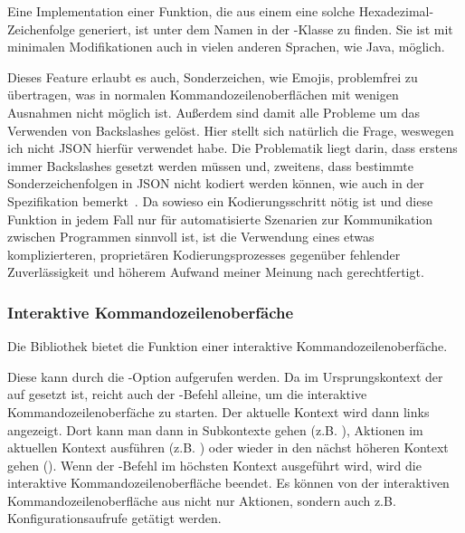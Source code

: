 Eine Implementation einer Funktion, die aus einem  eine solche Hexadezimal-Zeichenfolge generiert, ist unter dem Namen  in der -Klasse zu finden.
Sie ist mit minimalen Modifikationen auch in vielen anderen Sprachen, wie Java, möglich.

Dieses Feature erlaubt es auch, Sonderzeichen, wie Emojis, problemfrei zu übertragen, was in normalen Kommandozeilenoberflächen mit wenigen Ausnahmen nicht möglich ist.
Außerdem sind damit alle Probleme um das Verwenden von Backslashes gelöst.
Hier stellt sich natürlich die Frage, weswegen ich nicht JSON hierfür verwendet habe.
Die Problematik liegt darin, dass erstens immer Backslashes gesetzt werden müssen und, zweitens, dass bestimmte Sonderzeichenfolgen in JSON nicht kodiert werden können, wie auch in der Spezifikation bemerkt~\cite{JSONSpec}.
Da sowieso ein Kodierungsschritt nötig ist und diese Funktion in jedem Fall nur für automatisierte Szenarien zur Kommunikation zwischen Programmen sinnvoll ist,
ist die Verwendung eines etwas komplizierteren, proprietären Kodierungsprozesses gegenüber fehlender Zuverlässigkeit und höherem Aufwand meiner Meinung nach gerechtfertigt.
\subsubsection{Interaktive Kommandozeilenoberfäche}
Die Bibliothek bietet die Funktion einer interaktive Kommandozeilenoberfäche.

Diese kann durch die -Option aufgerufen werden.
Da im Ursprungskontext der  auf  gesetzt ist,
reicht auch der -Befehl alleine, um die interaktive Kommandozeilenoberfäche zu starten.
Der aktuelle Kontext wird dann links angezeigt.
Dort kann man dann in Subkontexte gehen (z.B. ), Aktionen im aktuellen Kontext ausführen (z.B. )
oder wieder in den nächst höheren Kontext gehen ().
Wenn der -Befehl im höchsten Kontext ausgeführt wird, wird die interaktive Kommandozeilenoberfläche beendet.
Es können von der interaktiven Kommandozeilenoberfläche aus nicht nur Aktionen, sondern auch z.B. Konfigurationsaufrufe getätigt werden.
